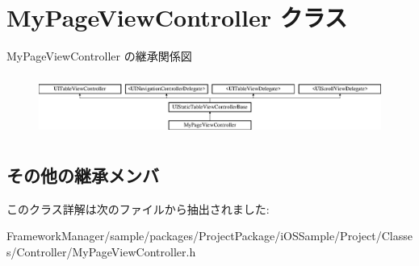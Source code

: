 \hypertarget{interface_my_page_view_controller}{}\section{My\+Page\+View\+Controller クラス}
\label{interface_my_page_view_controller}
My\+Page\+View\+Controller の継承関係図\begin{figure}[H]
\begin{center}
\leavevmode
\includegraphics[height=1.990521cm]{interface_my_page_view_controller}
\end{center}
\end{figure}
\subsection*{その他の継承メンバ}


このクラス詳解は次のファイルから抽出されました\+:\begin{DoxyCompactItemize}
\item 
Framework\+Manager/sample/packages/\+Project\+Package/i\+O\+S\+Sample/\+Project/\+Classes/\+Controller/My\+Page\+View\+Controller.\+h\end{DoxyCompactItemize}
